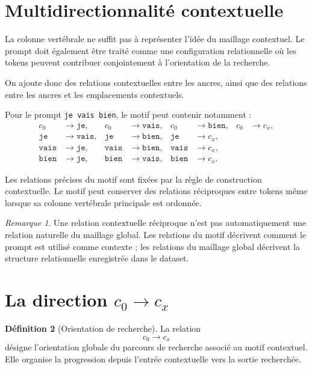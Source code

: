 \documentclass[11pt,a4paper]{report}
\theoremstyle{definition}
\newtheorem{definition}{Définition}[chapter]
\theoremstyle{plain}
\theoremstyle{remark}
\newtheorem{remarque}[definition]{Remarque}
\begin{document}
\section{Multidirectionnalité contextuelle}

La colonne vertébrale ne suffit pas à représenter l'idée du
maillage contextuel. Le prompt doit également être traité comme
une configuration relationnelle où les tokens peuvent contribuer
conjointement à l'orientation de la recherche.

On ajoute donc des relations contextuelles entre les ancres,
ainsi que des relations entre les ancres et les emplacements
contextuels.

Pour le prompt \texttt{je vais bien}, le motif peut contenir
notamment :
\[
\begin{aligned}
c_0&\to\texttt{je},&
c_0&\to\texttt{vais},&
c_0&\to\texttt{bien},&
c_0&\to c_x,\\
\texttt{je}&\to\texttt{vais},&
\texttt{je}&\to\texttt{bien},&
\texttt{je}&\to c_x,\\
\texttt{vais}&\to\texttt{je},&
\texttt{vais}&\to\texttt{bien},&
\texttt{vais}&\to c_x,\\
\texttt{bien}&\to\texttt{je},&
\texttt{bien}&\to\texttt{vais},&
\texttt{bien}&\to c_x.
\end{aligned}
\]

Les relations précises du motif sont fixées par la règle de
construction contextuelle. Le motif peut conserver des relations
réciproques entre tokens même lorsque sa colonne vertébrale
principale est ordonnée.

\begin{remarque}
Une relation contextuelle réciproque n'est pas automatiquement
une relation naturelle du maillage global. Les relations du
motif décrivent comment le prompt est utilisé comme contexte ;
les relations du maillage global décrivent la structure
relationnelle enregistrée dans le dataset.
\end{remarque}

\section{La direction \(c_0\to c_x\)}

\begin{definition}[Orientation de recherche]
La relation
\[
c_0\longrightarrow c_x
\]
désigne l'orientation globale du parcours de recherche associé
au motif contextuel. Elle organise la progression depuis
l'entrée contextuelle vers la sortie recherchée.
\end{definition}
\end{document}
